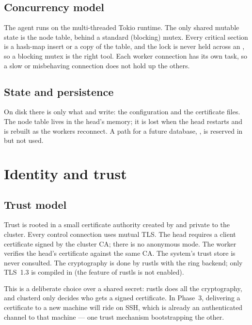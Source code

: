 \documentclass{article}
\begin{document}
\subsection{Concurrency model}

The agent runs on the multi-threaded Tokio runtime. The only shared
mutable state is the node table, behind a standard (blocking) mutex. Every
critical section is a hash-map insert or a copy of the table, and the
lock is never held across an , so a blocking mutex is the
right tool. Each worker connection has its own task, so a slow or
misbehaving connection does not hold up the others.

\subsection{State and persistence}

On disk there is only what  and
 write: the configuration and the certificate
files. The node table lives in the head's memory; it is lost when the head
restarts and is rebuilt as the workers reconnect. A path for a future
database, , is reserved in  but not used.

\section{Identity and trust}

\subsection{Trust model}

Trust is rooted in a small certificate authority created by
 and private to the cluster. Every control
connection uses mutual TLS. The head requires a client certificate signed
by the cluster CA; there is no anonymous mode. The worker verifies the
head's certificate against the same CA. The system's trust store is never
consulted. The cryptography is done by rustls with the ring backend; only
TLS~1.3 is compiled in (the  feature of rustls is not
enabled).

This is a deliberate choice over a shared secret: rustls does all the
cryptography, and clusterd only decides who gets a signed certificate.
In Phase~3, delivering a certificate to a new machine will ride on SSH,
which is already an authenticated channel to that machine --- one trust
mechanism bootstrapping the other.
\end{document}
